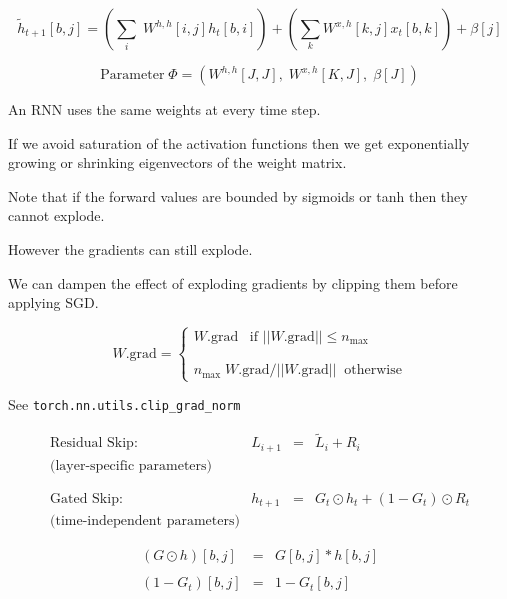 {$$\tilde{h}_{t+1}[b,j] = \left(\sum_i\;W^{h,h}[i,j]h_t[b,i]\right) + \left(\sum_k W^{x,h}[k,j]x_t[b,k]\right) + \beta[j]$$

\vfill
$$\mathrm{Parameter}\;\Phi = (W^{h,h}[J,J],\;W^{x,h}[K,J],\;\beta[J])$$


An RNN uses the same weights at every time step.

\vfill
If we avoid saturation of the activation functions then we get exponentially growing or shrinking eigenvectors of the weight matrix.

\vfill
Note that if the forward values are bounded by sigmoids or tanh then they cannot explode.

\vfill
However the gradients can still explode.


\vfill
We can dampen the effect of exploding gradients by clipping them before applying SGD.

\vfill
$$W.\mathrm{grad} = \left\{\begin{array}{l} W.\mathrm{grad} \;\;\;\mbox{if $||W.\mathrm{grad}|| \leq n_{\mathrm{max}}$} \\
                                                      \\ \\
                                                      n_{\mathrm{max}} \; W.\mathrm{grad} / ||W.\mathrm{grad}|| \;\; \mbox{otherwise}
\end{array} \right.$$

\vfill
See {\tt torch.nn.utils.clip\_grad\_norm}



$$\begin{array}{lrcl}
\mbox{Residual Skip:} & L_{i+1} & = & \tilde{L}_i + R_i \\
\mbox{(layer-specific parameters)} \\
\\
\\
\mbox{Gated Skip:} & h_{t+1} & = & G_t\odot h_t + (1-G_t)\odot R_t \\
\mbox{(time-independent parameters)}
\end{array}$$

\vfill
\begin{eqnarray*}
(G\odot h)[b,j] & = & G[b,j] * h[b,j] \\
\\
(1-G_t)[b,j] & = & 1-G_t[b,j]
\end{eqnarray*}

}
